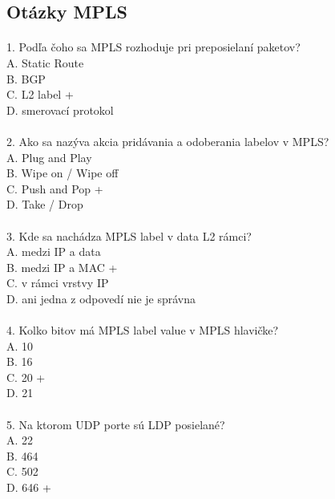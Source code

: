 \documentclass[12pt,twoside,a4paper]{report}
\begin{document}
\subsection{Otázky MPLS}
\paragraph{}
1. Podľa čoho sa MPLS rozhoduje pri preposielaní paketov?\\
A. Static Route\\
B. BGP\\
C. L2 label +\\
D. smerovací protokol\\

\paragraph{}
2. Ako sa nazýva akcia pridávania a odoberania labelov v MPLS?\\
A. Plug and Play\\
B. Wipe on / Wipe off\\
C. Push and Pop +\\
D. Take / Drop\\

\paragraph{}
3. Kde sa nachádza MPLS label v data L2 rámci?\\
A. medzi IP a data\\
B. medzi IP a MAC +\\
C. v rámci vrstvy IP\\
D. ani jedna z odpovedí nie je správna\\

\paragraph{}
4. Kolko bitov má MPLS label value v MPLS hlavičke?\\
A. 10\\
B. 16\\
C. 20 +\\
D. 21\\

\paragraph{}
5. Na ktorom UDP porte sú LDP posielané?\\
A. 22\\
B. 464\\
C. 502\\
D. 646 +\\
\end{document}
